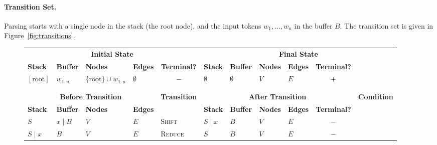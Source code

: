 \documentclass[11pt]{article}
\newcommand{\figref}[1]{Figure~\ref{#1}}
\begin{document}
\paragraph{Transition Set.}
Parsing starts with a single node in the stack (the root node), and the input tokens
$w_1, \ldots, w_n$ in the buffer $B$. The transition set is given in \figref{fig:transitions}.

\begin{figure*}
\captionsetup{justification=centering}
\begin{adjustbox}{width=\textwidth,margin=3pt,frame}
\begin{tabular}{llll|l|llllc|c}
\multicolumn{5}{c|}{\textbf{\small Initial State}} & \multicolumn{6}{c}{\textbf{\small Final State}} \\
\textbf{\footnotesize Stack} & \textbf{\footnotesize Buffer} & \textbf{\footnotesize Nodes} & \multicolumn{1}{l}{\textbf{\footnotesize Edges}} & \multicolumn{1}{c|}{\textbf{\footnotesize Terminal?}} & \textbf{\footnotesize Stack} & \textbf{\footnotesize Buffer} & \textbf{\footnotesize Nodes} & \textbf{\footnotesize Edges} & \multicolumn{1}{c}{\textbf{\footnotesize Terminal?}} \\
$[\mathrm{root}]$ & $w_{1:n}$ & \multirow{2}{40pt}{$\{\mathrm{root}\} \cup w_{1:n}$} & \multicolumn{1}{l}{$\emptyset$} & \multicolumn{1}{c|}{$-$} & $\emptyset$ & $\emptyset$ & $V$ & $E$ & \multicolumn{1}{c}{$+$} \\ 
\multicolumn{5}{c|}{} \\
\multicolumn{5}{c|}{} \\
\hline
\multicolumn{4}{c|}{\textbf{\small Before Transition}} & \textbf{\small Transition} & \multicolumn{5}{c|}{\textbf{\small After Transition}} & \textbf{\small Condition} \\
\textbf{\footnotesize Stack} & \textbf{\footnotesize Buffer} & \textbf{\footnotesize Nodes} & \textbf{\footnotesize Edges} & & \textbf{\footnotesize Stack} & \textbf{\footnotesize Buffer} & \textbf{\footnotesize Nodes} & \textbf{\footnotesize Edges} & \textbf{\footnotesize Terminal?} & \\
$S$ & $x \;|\; B$ & $V$ & $E$ & \textsc{Shift} & $S \;|\; x$ & $B$ & $V$ & $E$ & $-$ & \\
$S \;|\; x$ & $B$ & $V$ & $E$ & \textsc{Reduce} & $S$ & $B$ & $V$ & $E$ & $-$ & \\

\end{tabular}
\end{adjustbox}
\end{figure*}
\end{document}
